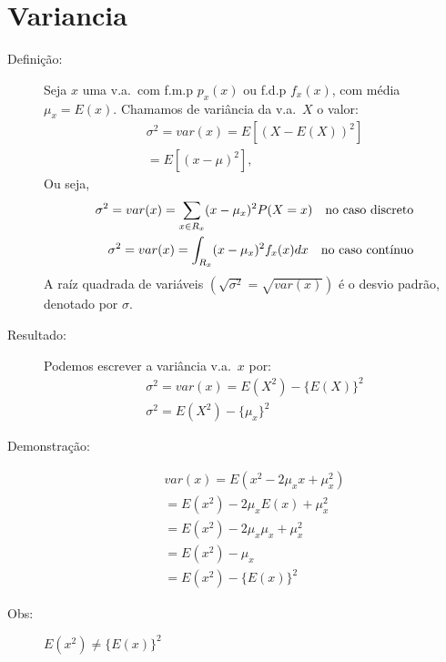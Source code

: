\documentclass[11pt,a4paper]{book}
\begin{document}
 \section{Variancia}

 \begin{description}
   \item [Definição:] Seja $x$ uma v.a.\ com f.m.p $p_{x}(x)$ ou f.d.p $f_{x}(x)$, com 
     média $\mu_{x}=E(x)$. Chamamos de variância da v.a.\ $X$ o valor: 
     \begin{align}
       \sigma^2=var(x)=E[(X-E(X))^2]\\
       =E[(x-\mu)^2],
     \end{align}
     Ou seja,
     \begin{align}
       \sigma^2 =var(x)=\sum_{x \in R_{x}} (x-\mu_{x})^2 P(X=x) \text{\quad no caso discreto}\\
       \sigma^2 =var(x)=\int_{R_{x}} (x-\mu_{x})^2 f_{x}(x)dx \text{\quad no caso contínuo}
     \end{align}
     A raíz quadrada de variáveis $(\sqrt{\sigma^2}=\sqrt{var(x)})$ é o desvio padrão, 
     denotado por $\sigma$.
   \item [Resultado:] Podemos escrever a variância v.a.\ $x$ por: 
     \begin{align}
       \sigma^2 =var(x)=E(X^2)-\{E(X)\}^2\\
       \sigma^2 =E(X^2)-\{\mu_x\}^2
     \end{align}
   \item [Demonstração:] 
     \begin{align}
       var(x)=E(x^2-2\mu_{x}x+\mu_{x}^2)\\
       =E(x^2)-2\mu_{x}E(x)+\mu_{x}^2\\
       =E(x^2)-2\mu_{x}\mu_{x}+\mu_{x}^2\\
       =E(x^2)-\mu_{x}\\
       =E(x^2)-\{E(x)\}^2
     \end{align}
   \item [Obs:] $E(x^2) \neq \{E(x)\}^2$


\end{description}
\end{document}
